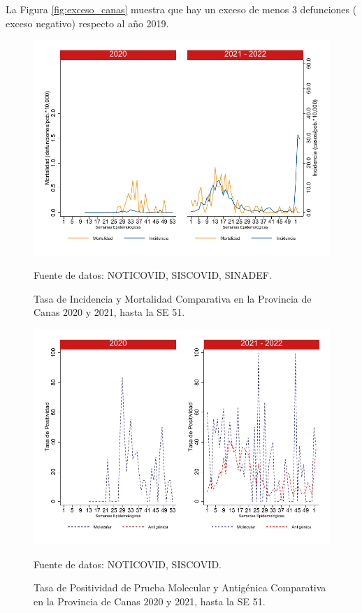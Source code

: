 \documentclass[12pt,a4paper,openany]{book}
\begin{document}
		La Figura \ref{fig:exceso_canas} muestra que hay un exceso de menos 3 defunciones ( exceso negativo) respecto al año 2019.
		
		\begin{figure}[h]
			\caption{Tasa de Incidencia y Mortalidad Comparativa en la Provincia de Canas 2020 y 2021, hasta la SE 51.}\label{fig:inc_mort_canas}
			\begin{center}
				\includegraphics[width=0.7\linewidth]{../figuras/incidencia_mortalidad_20_21_3}
			\end{center}
			{\footnotesize {Fuente de datos: NOTICOVID, SISCOVID, SINADEF.}}
		\end{figure}
		
		\begin{figure}[h]
			\caption{Tasa de Positividad de Prueba Molecular y Antigénica Comparativa en la Provincia de Canas 2020 y 2021, hasta la SE 51.}\label{fig:positividad_canas}
			\begin{center}
				\includegraphics[width=0.7\linewidth]{../figuras/positividad_20_21_3}
			\end{center}
			{\footnotesize {Fuente de datos: NOTICOVID, SISCOVID.}}
		\end{figure}
		
\end{document}
